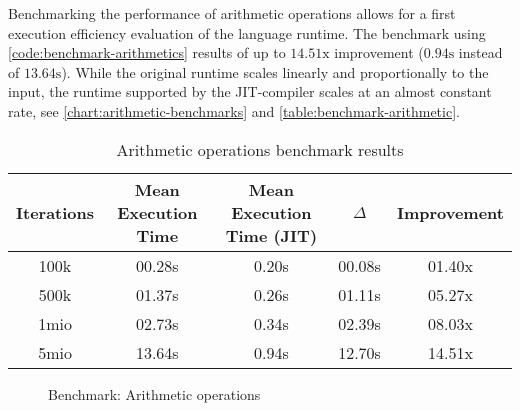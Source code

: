 Benchmarking the performance of arithmetic operations allows for a first
execution efficiency evaluation of the language runtime. The benchmark using
\autoref{code:benchmark-arithmetics} results of up to $14.51\textrm{x}$
improvement ($0.94\textrm{s}$ instead of $13.64\textrm{s}$). While the original
runtime scales linearly and proportionally to the input, the runtime supported
by the JIT-compiler scales at an almost constant rate, see
\autoref{chart:arithmetic-benchmarks} and \autoref{table:benchmark-arithmetic}.

\begin{table}[H]
    \centering
    \begin{tabular}{c|c|c|c|c}
        Iterations & Mean Execution Time & Mean Execution Time (JIT) & $\Delta$ & Improvement \\ 
        \hline
        100k & 00.28s & 0.20s & 00.08s & 01.40x \\ 
        500k & 01.37s & 0.26s & 01.11s & 05.27x \\
        1mio & 02.73s & 0.34s & 02.39s & 08.03x \\
        5mio & 13.64s & 0.94s & 12.70s & 14.51x \\
    \end{tabular}
    \caption{Arithmetic operations benchmark results }
    \label{table:benchmark-arithmetic}
\end{table}


\begin{figure}[H]
    \centering
    \caption{Benchmark: Arithmetic operations}
    \label{chart:arithmetic-benchmarks}
\end{figure}


